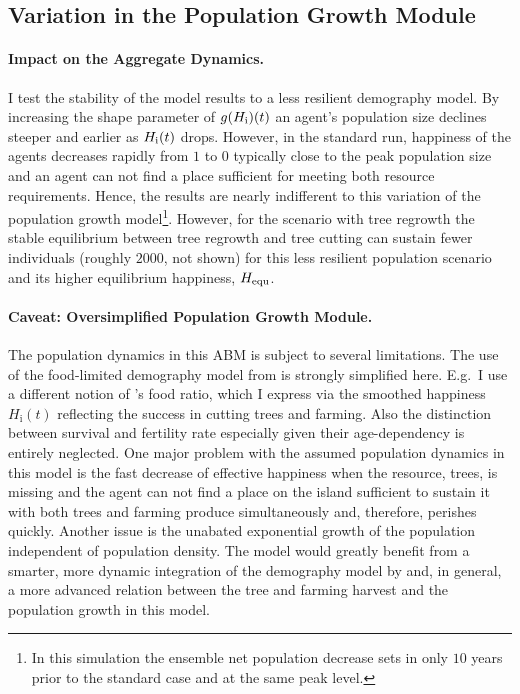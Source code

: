 \FloatBarrier
\subsection{Variation in the Population Growth Module}

\paragraph{Impact on the Aggregate Dynamics.}
I test the stability of the model results to a less resilient demography model.
By increasing the shape parameter of $g(H_{\rm i})(t)$ an agent's population size declines steeper and earlier as $H_{\rm i}(t)$ drops.
However, in the standard run, happiness of the agents decreases rapidly from $1$ to $0$ typically close to the peak population size and an agent can not find a place sufficient for meeting both resource requirements.
Hence, the results are nearly indifferent to this variation of the population growth model\footnote{In this simulation the ensemble net population decrease sets in only $10$ years prior to the standard case and at the same peak level.}.
However, for the scenario with tree regrowth 
the stable equilibrium between tree regrowth and tree cutting can sustain fewer individuals (roughly $2000$, not shown) for this less resilient population scenario and its higher equilibrium happiness, $H_{\rm equ}$.

\paragraph{Caveat: Oversimplified Population Growth Module.}
The population dynamics in this ABM is subject to several limitations.
The use of the food-limited demography model from \citet{Puleston2017} is strongly simplified here.
E.g.\ I use a different notion of \citet{Puleston2017}'s food ratio, which I express via the smoothed happiness $H_\text{i}(t)$ reflecting the success in cutting trees and farming.
Also the distinction between survival and fertility rate especially given their age-dependency is entirely neglected.
One major problem with the assumed population dynamics in this model is the fast decrease of effective happiness when the resource, trees, is missing and the agent can not find a place on the island sufficient to sustain it with both trees and farming produce simultaneously and, therefore, perishes quickly.
Another issue is the unabated exponential growth of the population independent of population density.
The model would greatly benefit from a smarter, more dynamic integration of the demography model by \citet{Puleston2017} and, in general, a more advanced relation between the tree and farming harvest and the population growth in this model.



